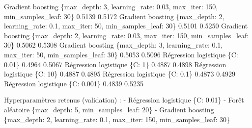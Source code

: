 \documentclass[
  10pt,
]{article}
\newenvironment{Shaded}{}{}
\newcommand{\NormalTok}[1]{#1}
\begin{document}
\begin{Shaded}
\begin{Highlighting}[]
\NormalTok{    Gradient boosting \{\textquotesingle{}max\_depth\textquotesingle{}: 3, \textquotesingle{}learning\_rate\textquotesingle{}: 0.03, \textquotesingle{}max\_iter\textquotesingle{}: 150, \textquotesingle{}min\_samples\_leaf\textquotesingle{}: 30\}              0.5139   0.5172}
\NormalTok{    Gradient boosting   \{\textquotesingle{}max\_depth\textquotesingle{}: 2, \textquotesingle{}learning\_rate\textquotesingle{}: 0.1, \textquotesingle{}max\_iter\textquotesingle{}: 50, \textquotesingle{}min\_samples\_leaf\textquotesingle{}: 30\}              0.5101   0.5250}
\NormalTok{    Gradient boosting \{\textquotesingle{}max\_depth\textquotesingle{}: 2, \textquotesingle{}learning\_rate\textquotesingle{}: 0.03, \textquotesingle{}max\_iter\textquotesingle{}: 150, \textquotesingle{}min\_samples\_leaf\textquotesingle{}: 30\}              0.5062   0.5308}
\NormalTok{    Gradient boosting   \{\textquotesingle{}max\_depth\textquotesingle{}: 3, \textquotesingle{}learning\_rate\textquotesingle{}: 0.1, \textquotesingle{}max\_iter\textquotesingle{}: 50, \textquotesingle{}min\_samples\_leaf\textquotesingle{}: 30\}              0.5053   0.5096}
\NormalTok{Régression logistique                                                                      \{\textquotesingle{}C\textquotesingle{}: 0.01\}              0.4964   0.5067}
\NormalTok{Régression logistique                                                                         \{\textquotesingle{}C\textquotesingle{}: 1\}              0.4887   0.4898}
\NormalTok{Régression logistique                                                                        \{\textquotesingle{}C\textquotesingle{}: 10\}              0.4887   0.4895}
\NormalTok{Régression logistique                                                                       \{\textquotesingle{}C\textquotesingle{}: 0.1\}              0.4873   0.4929}
\NormalTok{Régression logistique                                                                     \{\textquotesingle{}C\textquotesingle{}: 0.001\}              0.4839   0.5235}

\NormalTok{Hyperparamètres retenus (validation) :}
\NormalTok{ {-} Régression logistique \{\textquotesingle{}C\textquotesingle{}: 0.01\}}
\NormalTok{ {-} Forêt aléatoire \{\textquotesingle{}max\_depth\textquotesingle{}: 5, \textquotesingle{}min\_samples\_leaf\textquotesingle{}: 20\}}
\NormalTok{ {-} Gradient boosting \{\textquotesingle{}max\_depth\textquotesingle{}: 2, \textquotesingle{}learning\_rate\textquotesingle{}: 0.1, \textquotesingle{}max\_iter\textquotesingle{}: 150, \textquotesingle{}min\_samples\_leaf\textquotesingle{}: 30\}}
\end{Highlighting}
\end{Shaded}
\end{document}
